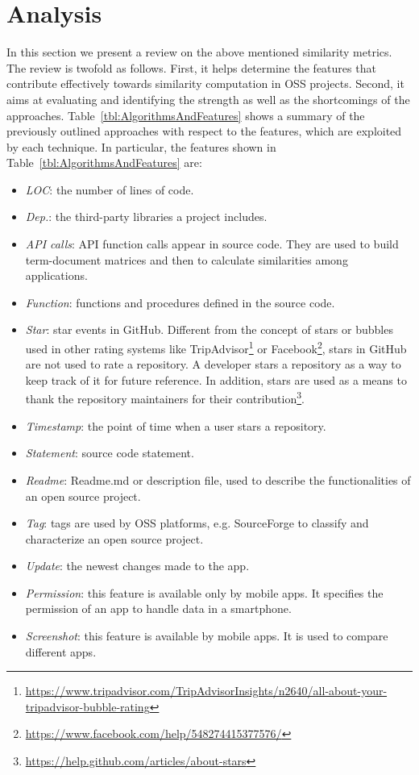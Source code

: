 \section{Analysis} \label{sec:Analysis}

In this section we present a review on the above mentioned similarity metrics. The review is twofold as follows. First, it helps determine the features that contribute effectively towards similarity computation in OSS projects. Second, it aims at evaluating and identifying the strength as well as the shortcomings of the approaches. Table~\ref{tbl:AlgorithmsAndFeatures} shows a summary of the previously outlined approaches with respect to the features, which are exploited by each technique. In particular, the features shown in Table~\ref{tbl:AlgorithmsAndFeatures}  are:

\begin{itemize}
	\item {\em LOC}: the number of lines of code.
	\item {\em Dep.}: the third-party libraries a project includes.
	\item {\em API calls}: API function calls appear in source code. They are used to build term-document matrices and then to calculate similarities among applications.
	\item {\em Function}: functions and procedures defined in the source code.
	\item {\em Star}: star events in GitHub. Different from the concept of stars or bubbles used in other rating systems like TripAdvisor\footnote{\url{https://www.tripadvisor.com/TripAdvisorInsights/n2640/all-about-your-tripadvisor-bubble-rating}} or Facebook\footnote{\url{https://www.facebook.com/help/548274415377576/}}, stars in GitHub are not used to rate a repository. A developer stars a repository as a way to keep track of it for future reference. In addition, stars are used as a means to thank the repository maintainers for their contribution\footnote{\url{https://help.github.com/articles/about-stars}}.
	\item {\em Timestamp}: the point of time when a user stars a repository. %
	\item {\em Statement}: source code statement.
	\item {\em Readme}: Readme.md or description file, used to describe the functionalities of an open source project. 
	\item {\em Tag}: tags are used by OSS platforms, e.g. SourceForge to classify and characterize an open source project.
	\item {\em Update}: the newest changes made to the app.
	\item {\em Permission}: this feature is available only by mobile apps. It specifies the permission of an app to handle data in a smartphone.
	\item {\em Screenshot}: this feature is available by mobile apps. It is used to compare different apps.
\end{itemize}


